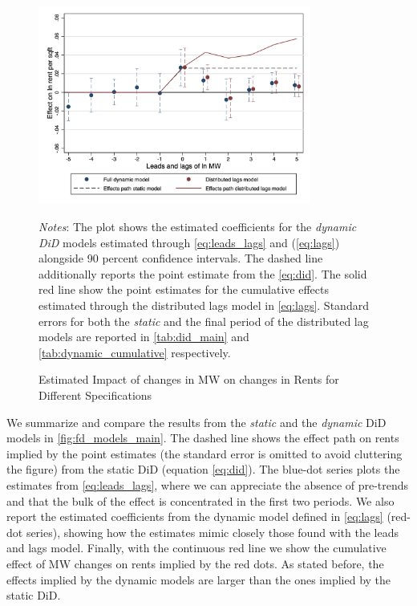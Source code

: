 \begin{figure}
    \caption{Estimated Impact of changes in MW on changes in Rents for Different Specifications}
    \label{fig:fd_models_main}
    \centering
    \includegraphics[width = 0.8\textwidth]{../analysis/first_differences/output/fd_models.png}
    \begin{minipage}{0.95\textwidth} \footnotesize
		\vspace{2mm} 
		\textit{Notes}: The plot shows the estimated coefficients for the \textit{dynamic DiD} 
		models estimated through \autoref{eq:leads_lags} and (\ref{eq:lags}) alongside 90 percent 
		confidence intervals. The dashed line additionally reports the point estimate from the 
		\autoref{eq:did}. The solid red line show the point estimates for the cumulative effects 
		estimated through the distributed lags model in \autoref{eq:lags}. Standard errors for both 
		the \textit{static} and the final period of the distributed lag models are reported in 
		\autoref{tab:did_main} and \autoref{tab:dynamic_cumulative} respectively. 
	\end{minipage}
\end{figure}

We summarize and compare the results from the \textit{static} and the \textit{dynamic} DiD models 
in \autoref{fig:fd_models_main}. The dashed line shows the effect path on rents implied by the 
point estimates (the standard error is omitted to avoid cluttering the figure) from the static DiD 
(equation \ref{eq:did}). The blue-dot series plots the estimates from \autoref{eq:leads_lags}, where 
we can appreciate the absence of pre-trends and that the bulk of the effect is concentrated in the 
first two periods. We also report the estimated coefficients from the dynamic model defined in 
\autoref{eq:lags} (red-dot series), showing how the estimates mimic closely those found with the 
leads and lags model. Finally, with the continuous red line we show the cumulative effect of MW 
changes on rents implied by the red dots. As stated before, the effects implied by the dynamic models 
are larger than the ones implied by the static DiD.

